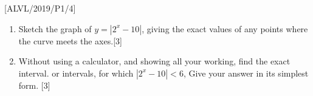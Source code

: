 \item {[}ALVL/2019/P1/4{]}
\begin{enumerate}
\item Sketch the graph of $y=\left|2^{x}-10\right|$, giving the exact values
of any points where the curve meets the axes.\hfill{}{[}3{]}
\item Without using a calculator, and showing all your working, find the
exact interval. or intervals, for which $\left|2^{x}-10\right|<6$,
Give your answer in its simplest form.\hfill{} {[}3{]}
\end{enumerate}
